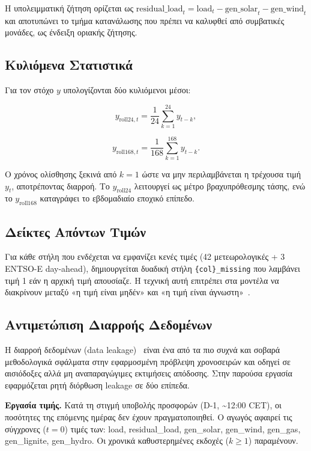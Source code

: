 Η υπολειμματική ζήτηση ορίζεται ως
$\text{residual\_load}_t = \text{load}_t - \text{gen\_solar}_t - \text{gen\_wind}_t$
και αποτυπώνει το τμήμα κατανάλωσης που πρέπει να καλυφθεί από συμβατικές μονάδες,
ως ένδειξη οριακής ζήτησης.


\subsection{Κυλιόμενα Στατιστικά}

Για τον στόχο $y$ υπολογίζονται δύο κυλιόμενοι μέσοι:

\begin{equation}
  y_{\text{roll24},t} = \frac{1}{24}\sum_{k=1}^{24} y_{t-k},
  \label{eq:roll24}
\end{equation}

\begin{equation}
  y_{\text{roll168},t} = \frac{1}{168}\sum_{k=1}^{168} y_{t-k}.
  \label{eq:roll168}
\end{equation}

Ο χρόνος ολίσθησης ξεκινά από $k=1$ ώστε να μην περιλαμβάνεται η τρέχουσα τιμή $y_t$,
αποτρέποντας διαρροή. Το $y_{\text{roll24}}$ λειτουργεί ως μέτρο βραχυπρόθεσμης τάσης,
ενώ το $y_{\text{roll168}}$ καταγράφει το εβδομαδιαίο εποχικό επίπεδο.


\subsection{Δείκτες Απόντων Τιμών}

Για κάθε στήλη που ενδέχεται να εμφανίζει κενές τιμές (42 μετεωρολογικές + 3 ENTSO-E
day-ahead), δημιουργείται δυαδική στήλη \texttt{\{col\}\_missing} που λαμβάνει τιμή 1
εάν η αρχική τιμή απουσίαζε. Η τεχνική αυτή επιτρέπει στα μοντέλα να διακρίνουν μεταξύ
«η τιμή είναι μηδέν» και «η τιμή είναι άγνωστη»~\cite{goodfellow2016deep}.


\subsection{Αντιμετώπιση Διαρροής Δεδομένων}
\label{sec:leakage}

Η διαρροή δεδομένων (data leakage)~\cite{kaufman2012leakage} είναι ένα από τα πιο συχνά και σοβαρά μεθοδολογικά σφάλματα στην εφαρμοσμένη πρόβλεψη χρονοσειρών και οδηγεί σε
αισιόδοξες αλλά μη αναπαραγώγιμες εκτιμήσεις απόδοσης. Στην παρούσα εργασία
εφαρμόζεται ρητή διόρθωση leakage σε δύο επίπεδα.

\textbf{Εργασία τιμής.} Κατά τη στιγμή υποβολής προσφορών (D-1, \textasciitilde12:00 CET),
οι ποσότητες της επόμενης ημέρας δεν έχουν πραγματοποιηθεί. Ο αγωγός αφαιρεί τις
σύγχρονες ($t=0$) τιμές των: load, residual\_load, gen\_solar, gen\_wind, gen\_gas,
gen\_lignite, gen\_hydro. Οι χρονικά καθυστερημένες εκδοχές ($k \geq 1$) παραμένουν.

